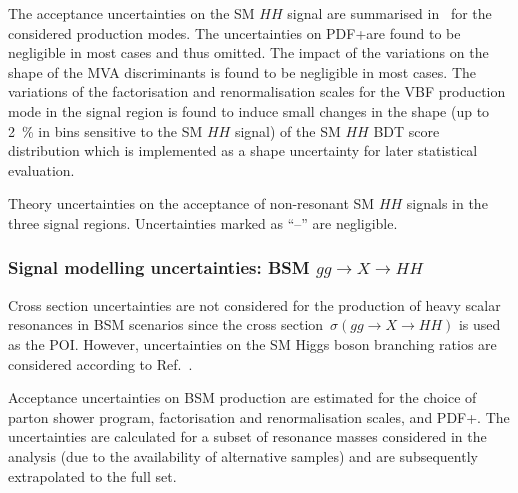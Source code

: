 The acceptance uncertainties on the SM $HH$ signal are summarised
in~ for the considered production
modes. The uncertainties on PDF+\alphas are found to be negligible in
most cases and thus omitted. The impact of the variations on the shape
of the MVA discriminants is found to be negligible in most cases. The
variations of the factorisation and renormalisation scales for the VBF
production mode in the \hadhad signal region is found to induce small
changes in the shape (up to \SI{2}{\percent} in bins sensitive to the
SM $HH$ signal) of the SM $HH$ BDT score distribution which is
implemented as a shape uncertainty for later statistical evaluation.

\begin{table}[htbp]
  \centering

  \caption{Theory uncertainties on the acceptance of non-resonant SM
    $HH$ signals in the three signal regions. Uncertainties marked as
    ``--'' are negligible.}%
  \label{tab:theory_uncertainty_signal}

  
\end{table}


\subsubsection{Signal modelling uncertainties: BSM $gg \to X \to HH$}

Cross section uncertainties are not considered for the production of
heavy scalar resonances in BSM scenarios since the cross
section~$\sigma(gg \to X \to HH)$ is used as the POI. However,
uncertainties on the SM Higgs boson branching ratios are considered
according to Ref.~\cite{deFlorian:2016spz}.

Acceptance uncertainties on BSM \HH production are estimated for the
choice of parton shower program, factorisation and renormalisation
scales, and PDF+\alphas. The uncertainties are calculated for a subset
of resonance masses considered in the analysis (due to the
availability of alternative samples) and are subsequently extrapolated
to the full set.

